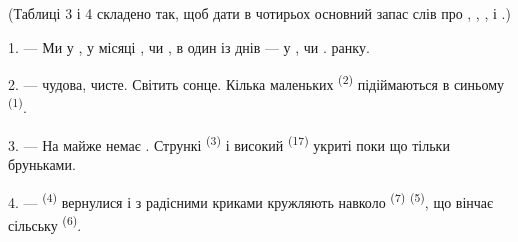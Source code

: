 %
%

\VUsaut{3.0mm}
\VUsaut{1.6mm}
\VUsaut{3.4mm}

(Таблиці 3 і 4 складено так, щоб дати в чотирьох 
основний запас слів про , , ,
 і .)
\VUsaut{4.0mm}

\VUsaut{3.0mm}

\VUsaut{2.4mm}

\VUsaut{3.0mm}

1. --- Ми у , у місяці ,  чи
, в один із днів  --- у ,
 чи .  ранку.

2. ---  чудова,  чисте. Світить сонце. Кілька
маленьких  \textsuperscript{(2)} підіймаються в синьому
 \textsuperscript{(1)}.

3. --- На  майже немає . Стрункі 
\textsuperscript{(3)} і високий  \textsuperscript{(17)} укриті
поки що тільки бруньками.

4. ---  \textsuperscript{(4)} вернулися і з радісними криками
кружляють навколо  \textsuperscript{(7)} 
\textsuperscript{(5)}, що вінчає сільську  \textsuperscript{(6)}.

